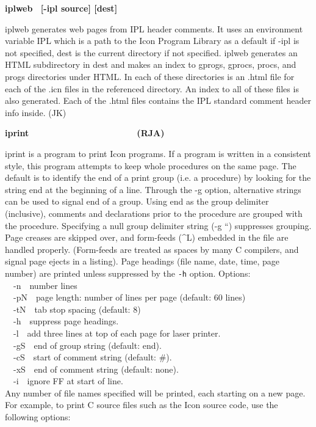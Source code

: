 {{\sffamily\bfseries
iplweb \ \textrm{\textmd{[-ipl source] [dest]}}}

\textsf{iplweb} generates web pages from IPL header
comments. It uses an environment variable IPL which is a path to the Icon
Program Library as a default if \textsf{{}-ipl} is not specified,
\textsf{dest} is the current directory if not specified.
\textsf{iplweb} generates an HTML subdirectory in
\textsf{dest} and makes an index to \textsf{gprogs}, \textsf{gprocs},
\textsf{procs}, and \textsf{progs} directories under HTML. In each of
these directories is an \textsf{.html} file for each of the
\textsf{.icn} files in the referenced directory. An index to all of
these files is also generated. Each of the \textsf{.html} files
contains the IPL standard comment header info inside. (JK)

{\sffamily\bfseries
iprint\ \ \ \ \ \ \ \ \ \ \ \ \ \ \ \ \ \ \ \ \ \ (RJA)}

\textsf{iprint} is a program to print Icon programs. If a program is
written in a consistent style, this program attempts to keep whole
procedures on the same page. The default is to identify the end of a
print group (i.e. a procedure) by looking for the string
{\textquotedbl}end{\textquotedbl} at the beginning of a line. Through
the -g option, alternative strings can be used to signal end of a
group. Using {\textquotedbl}end{\textquotedbl} as the group delimiter
(inclusive), comments and declarations prior to the procedure are
grouped with the procedure. Specifying a null group delimiter string
(\textsf{{}-g {\textquotedblleft}{\textquotedbl}}) suppresses grouping.
Page creases are skipped over, and form-feeds (\^{}L) embedded in the
file are handled properly. (Form-feeds are treated as spaces by many C
compilers, and signal page ejects in a listing). Page headings (file
name, date, time, page number) are printed unless suppressed by the
\texttt{{}-h} option. Options:\\
\ \ \textsf{{}-n}\ \ number lines\\
\ \ \textsf{{}-pN}\ \ page length: number of lines per page (default: 60
lines)\\
\ \ \textsf{{}-tN}\ \ tab stop spacing (default: 8)\\
\ \ \textsf{{}-h}\ \ suppress page headings.\\
\ \ \textsf{{}-l}\ \ add three lines at top of each page for laser
printer.\\
\ \ \textsf{{}-gS}\ \ end of group string (default:
{\textquotedbl}end{\textquotedbl}).\\
\ \ \textsf{{}-cS}\ \ start of comment string (default:
{\textquotedbl}\#{\textquotedbl}).\\
\ \ \textsf{{}-xS}\ \ end of comment string (default: none).\\
\ \ \textsf{{}-i}\ \  ignore FF at start of line.\\
Any number of file names specified will be printed, each starting on a
new page. For example, to print C source files such as the Icon source
code, use the following options:

}

